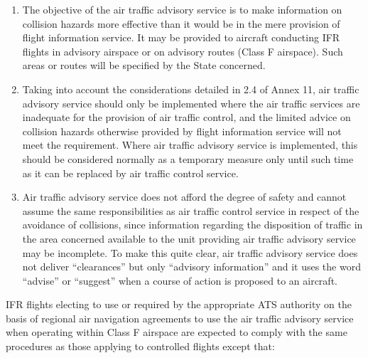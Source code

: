 \begin{enumeratesc}
    \begin{enumerate}
        \item The objective of the air traffic advisory service is to make information on collision hazards more effective than it would be in the mere provision of flight information service. It may be provided to aircraft conducting IFR flights in advisory airspace or on advisory routes (Class F airspace). Such areas or routes will be specified by the State concerned.
        \item Taking into account the considerations detailed in 2.4 of Annex 11, air traffic advisory service should only be implemented where the air traffic services are inadequate for the provision of air traffic control, and the limited advice on collision hazards otherwise provided by flight information service will not meet the requirement. Where air traffic advisory service is implemented, this should be considered normally as a temporary measure only until such time as it can be replaced by air traffic control service.
        \item Air traffic advisory service does not afford the degree of safety and cannot assume the same responsibilities as air traffic control service in respect of the avoidance of collisions, since information regarding the disposition of traffic in the area concerned available to the unit providing air traffic advisory service may be incomplete. To make this quite clear, air traffic advisory service does not deliver “clearances” but only “advisory information” and it uses the word “advise” or “suggest” when a course of action is proposed to an aircraft.
    \end{enumerate}

    \begin{enumerate}[labelindent=0pt,itemsep=0.2cm]
        
        \noindent IFR flights electing to use or required by the appropriate ATS authority on the basis of regional air navigation agreements to use the air traffic advisory service when operating within Class F airspace are expected to comply with the same procedures as those applying to controlled flights except that:


\end{enumerate}
\end{enumeratesc}
